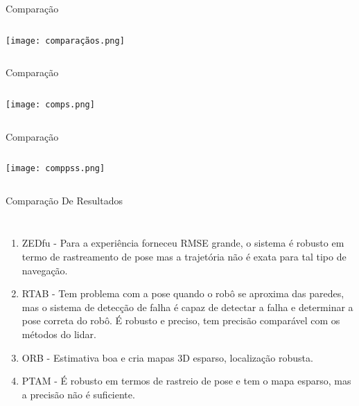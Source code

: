 \begin{frame}[t]{Comparação}
    \transboxout[duration=0.5]
    \begin{columns}
            \texttt{[image: comparaçãos.png]}       
    \end{columns}
\end{frame}
\begin{frame}[t]{Comparação}
    \transboxout[duration=0.5]
    \begin{columns}
            \texttt{[image: comps.png]}       
    \end{columns}
\end{frame}
\begin{frame}[t]{Comparação}
    \transboxout[duration=0.5]
    \begin{columns}
            \texttt{[image: comppss.png]}       
    \end{columns}
\end{frame}
\begin{frame}[t]{Comparação De Resultados}
    \transboxout[duration=0.5]
    \begin{columns}
            \begin{enumerate}
                \item ZEDfu - Para a experiência forneceu RMSE grande, o sistema é robusto em termo de rastreamento de pose mas a trajetória não é exata para tal tipo de navegação.
                \item RTAB - Tem problema com a pose quando o robô se aproxima das paredes, mas o sistema de detecção de falha é capaz de detectar a falha e determinar a pose correta do robô. É robusto e preciso, tem precisão comparável com os métodos do lidar.
                \item ORB - Estimativa boa e cria mapas 3D esparso, localização robusta.
                \item PTAM - É robusto em termos de rastreio de pose e tem o mapa esparso, mas a precisão não é suficiente. 
            \end{enumerate}
    \end{columns}
\end{frame}
